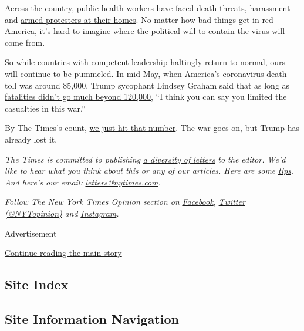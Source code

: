 Across the country, public health workers have faced
\href{https://www.sfgate.com/bayarea/article/CA-health-directors-quit-amid-death-threats-15343863.php}{death
threats}, harassment and
\href{https://www.washingtonpost.com/health/amid-threats-and-political-pushback-public-health-officials-leaving-posts/2020/06/22/6075f7a2-b0cf-11ea-856d-5054296735e5_story.html}{armed
protesters at their homes}. No matter how bad things get in red America,
it's hard to imagine where the political will to contain the virus will
come from.

So while countries with competent leadership haltingly return to normal,
ours will continue to be pummeled. In mid-May, when America's
coronavirus death toll was around 85,000, Trump sycophant Lindsey Graham
said that as long as
\href{https://www.politico.com/news/2020/05/14/white-house-coronavirus-success-259792}{fatalities
didn't go much beyond 120,000}, ``I think you can say you limited the
casualties in this war.''

By The Times's count,
\href{https://www.nytimes.com/interactive/2020/us/coronavirus-us-cases.html\#states}{we
just hit that number}. The war goes on, but Trump has already lost it.

\emph{The Times is committed to publishing}
\href{https://www.nytimes.com/2019/01/31/opinion/letters/letters-to-editor-new-york-times-women.html}{\emph{a
diversity of letters}} \emph{to the editor. We'd like to hear what you
think about this or any of our articles. Here are some}
\href{https://help.nytimes.com/hc/en-us/articles/115014925288-How-to-submit-a-letter-to-the-editor}{\emph{tips}}\emph{.
And here's our email:}
\href{mailto:letters@nytimes.com}{\emph{letters@nytimes.com}}\emph{.}

\emph{Follow The New York Times Opinion section on}
\href{https://www.facebook.com/nytopinion}{\emph{Facebook}}\emph{,}
\href{http://twitter.com/NYTOpinion}{\emph{Twitter (@NYTopinion)}}
\emph{and}
\href{https://www.instagram.com/nytopinion/}{\emph{Instagram}}\emph{.}

Advertisement

\protect\hyperlink{after-bottom}{Continue reading the main story}

\hypertarget{site-index}{%
\subsection{Site Index}\label{site-index}}

\hypertarget{site-information-navigation}{%
\subsection{Site Information
Navigation}\label{site-information-navigation}}

